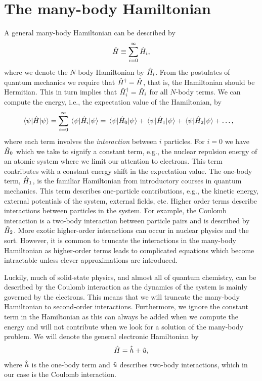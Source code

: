     \section{The many-body Hamiltonian}
        A general many-body Hamiltonian can be described by
        \begin{align}
            \hat{H} \equiv \sum_{i = 0}^{\infty} \hat{H}_i,
        \end{align}
        where we denote the $N$-body Hamiltonian by $\hat{H}_i$.
        From the postulates of quantum mechanics we require that
        $\hat{H}^{\dagger} = \hat{H}$, that is, the Hamiltonian should be
        Hermitian.
        This in turn implies that $\hat{H}_i^{\dagger} = \hat{H}_i$ for all
        $N$-body terms.
        We can compute the energy, i.e., the expectation value of the
        Hamiltonian, by
        \begin{align}
            \mel*{\psi}{\hat{H}}{\psi}
            &= \sum_{i = 0}^{\infty} \mel*{\psi}{\hat{H}_i}{\psi}
            = \mel*{\psi}{\hat{H}_0}{\psi}
            + \mel*{\psi}{\hat{H}_1}{\psi}
            + \mel*{\psi}{\hat{H}_2}{\psi}
            + \dots,
        \end{align}
        where each term involves the \emph{interaction} between $i$ particles.
        For $i = 0$ we have $\hat{H}_0$ which we take to signify a constant term,
        e.g., the nuclear repulsion energy of an atomic system where we limit
        our attention to electrons.
        This term contributes with a constant energy shift in the expectation
        value.
        The one-body term, $\hat{H}_1$, is the familiar Hamiltonian from
        introductory courses in quantum mechanics.
        This term describes one-particle contributions, e.g., the kinetic
        energy, external potentials of the system, external fields, etc.
        Higher order terms describe interactions between particles in the
        system.
        For example, the Coulomb interaction is a two-body interaction between
        particle pairs and is described by $\hat{H}_2$.
        More exotic higher-order interactions can occur in nuclear physics and
        the sort.
        However, it is common to truncate the interactions in the many-body
        Hamiltonian as higher-order terms leads to complicated equations which
        become intractable unless clever approximations are introduced.

        Luckily, much of solid-state physics, and almost all of quantum
        chemistry, can be described by the Coulomb interaction as the dynamics
        of the system is mainly governed by the electrons.
        This means that we will truncate the many-body Hamiltonian to
        second-order interactions.
        Furthermore, we ignore the constant term in the Hamiltonian as this can
        always be added when we compute the energy and will not contribute when
        we look for a solution of the many-body problem.
        We will denote the general electronic Hamiltonian by
        \begin{align}
            \hat{H} = \hat{h} + \hat{u},
        \end{align}
        where $\hat{h}$ is the one-body term and $\hat{u}$ describes
        two-body interactions, which in our case is the Coulomb interaction.


